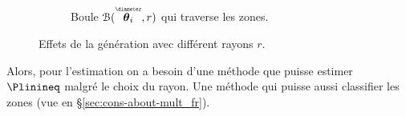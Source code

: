 \documentclass[../main.tex]{subfiles}
\begin{document}
\begin{figure}[h]
\begin{subfigure}{0.4\textwidth}
    \caption{Boule $\set{B}(\thetairestricted,r)$ qui traverse les zones.}\label{fig:ball_around_theta_restricted_traversing_fr}
  \end{subfigure}
  \caption{Effets de la génération avec différent rayons $r$.}
\end{figure}

Alors, pour l'estimation on a besoin d'une méthode que puisse estimer $\Plinineq$ malgré le choix du rayon.
Une méthode qui puisse aussi classifier les zones (vue en \S\ref{sec:cons-about-mult_fr}).
\end{document}
